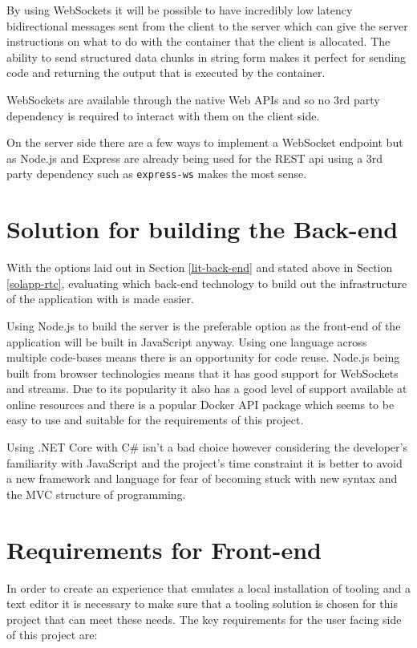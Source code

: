 By using WebSockets it will be possible to have incredibly low latency bidirectional messages sent from the client to the server which can give the server instructions on what to do with the container that the client is allocated. The ability to send structured data chunks in string form makes it perfect for sending code and returning the output that is executed by the container.

WebSockets are available through the native Web APIs and so no 3rd party dependency is required to interact with them on the client side.

On the server side there are a few ways to implement a WebSocket endpoint but as Node.js and Express are already being used for the REST api using a 3rd party dependency such as \texttt{express-ws} makes the most sense.

\section{Solution for building the Back-end}

With the options laid out in Section \ref{lit-back-end} and stated above in Section \ref{solapp-rtc}, evaluating which back-end technology to build out the infrastructure of the application with is made easier. 

Using Node.js to build the server is the preferable option as the front-end of the application will be built in JavaScript anyway. Using one language across multiple code-bases means there is an opportunity for code reuse. Node.js being built from browser technologies means that it has good support for WebSockets and streams. Due to its popularity it also has a good level of support available at online resources and there is a popular Docker API package \cite{dockerode} which seems to be easy to use and suitable for the requirements of this project.

Using .NET Core with C\# isn't a bad choice however considering the developer's familiarity with JavaScript and the project's time constraint it is better to avoid a new framework and language for fear of becoming stuck with new syntax and the MVC structure of programming.

\section{Requirements for Front-end} \label{solapp-front-end}

In order to create an experience that emulates a local installation of tooling and a text editor it is necessary to make sure that a tooling solution is chosen for this project that can meet these needs. The key requirements for the user facing side of this project are:

